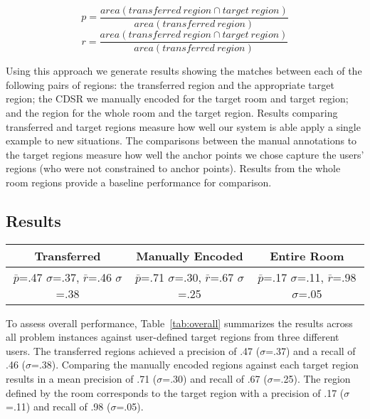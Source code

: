 \begin{equation}
	p=\frac{area(transferred\ region \cap target\ region)}{area(transferred\ region)}
\end{equation}
\begin{equation}
	r=\frac{area(transferred\ region \cap target\ region)}{area(transferred\ region)}
\end{equation}

Using this approach we generate results showing the matches between each of the following pairs of regions: the transferred region and the appropriate target region; the CDSR we manually encoded for the target room and target region; and the region for the whole room and the target region. 
Results comparing transferred and target regions measure how well our system is able apply a single example to new situations. The comparisons between the manual annotations to the target regions measure how well the anchor points we chose capture the users' regions (who were not constrained to anchor points). Results from the whole room regions provide a baseline performance for comparison. 


\subsection{Results}
\begin{table*}
	\center
\begin{tabular}{|c|c|c|}
\hline
Transferred & Manually Encoded & Entire Room \\
\hline
$\bar{p}$=.47 $\sigma$=.37, $\bar{r}$=.46 $\sigma$=.38 & $\bar{p}$=.71 $\sigma$=.30, $\bar{r}$=.67 $\sigma$=.25 & $\bar{p}$=.17 $\sigma$=.11, $\bar{r}$=.98 $\sigma$=.05  \\
\hline
\end{tabular}
\caption{Overall Performance Compared Against Target Regions Defined by Three Users}
  \label{tab:overall}	

\end{table*}

To assess overall performance, Table~\ref{tab:overall} summarizes the results across all problem instances against user-defined target regions from three different users. The transferred regions achieved a precision of .47 ($\sigma$=.37) and a recall of .46 ($\sigma$=.38). Comparing the manually encoded regions against each target region results in a mean precision of .71 ($\sigma$=.30) and recall of .67 ($\sigma$=.25). The region defined by the room corresponds to the target region with a precision of .17 ($\sigma$=.11) and recall of .98 ($\sigma$=.05).

